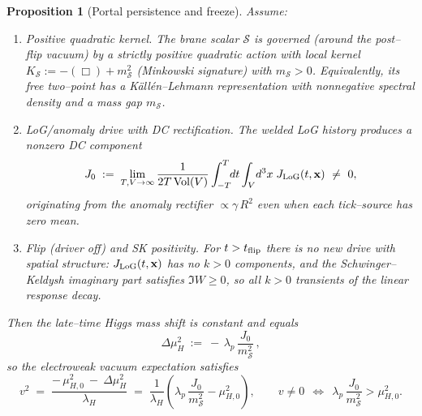 \documentclass[10pt]{article}
\theoremstyle{definition}
\theoremstyle{plain}
\newtheorem{proposition}{Proposition}[section]
\begin{document}
\begin{proposition}[Portal persistence and freeze]
\label{prop:persistence-freeze}
Assume:
\begin{enumerate}[label=(A\arabic*),leftmargin=1.8em,itemsep=2pt]
\item \emph{Positive quadratic kernel.} The brane scalar $\mathcal S$ is governed (around the
post–flip vacuum) by a strictly positive \emph{quadratic} action with local kernel
$K_{\mathcal S}:=-(\Box)+m_{\mathcal S}^2$ (Minkowski signature) with $m_{\mathcal S}>0$.
Equivalently, its free two–point has a Källén–Lehmann representation with nonnegative spectral
density and a mass gap $m_{\mathcal S}$.
\item \emph{LoG/anomaly drive with DC rectification.} The welded LoG history produces a nonzero
DC component
\[
J_0\;:=\;\lim_{T,V\to\infty}\frac{1}{2T\,\mathrm{Vol}(V)}\int_{-T}^{T}\!\!dt\int_{V}\!d^3x\;J_{\rm LoG}(t,\mathbf x)\ \neq\ 0,
\]
originating from the anomaly rectifier $\propto \gamma\,R^2$ even when each tick–source has zero mean.
\item \emph{Flip (driver off) and SK positivity.} For $t>t_{\rm flip}$ there is no new drive with
spatial structure: $J_{\rm LoG}(t,\mathbf x)$ has no $k>0$ components, and the Schwinger–Keldysh
imaginary part satisfies $\Im W\ge 0$, so all $k>0$ transients of the linear response decay.
\end{enumerate}
Then the late–time Higgs mass shift is \emph{constant} and equals
\begin{equation}
\label{eq:Delta-muH-const}
\Delta\mu_H^2\ :=\ -\,\lambda_p\,\frac{J_0}{m_{\mathcal S}^2}\,,
\end{equation}
so the electroweak vacuum expectation satisfies
\begin{equation}
\label{eq:v2-from-portal}
v^2\;=\;\frac{-\,\mu_{H,0}^2\ -\ \Delta\mu_H^2}{\lambda_H}
\;=\;\frac{1}{\lambda_H}\left(\lambda_p\,\frac{J_0}{m_{\mathcal S}^2}-\mu_{H,0}^2\right),
\qquad v\neq 0\ \ \Leftrightarrow\ \ \lambda_p\,\frac{J_0}{m_{\mathcal S}^2}>\mu_{H,0}^2.
\end{equation}
\end{proposition}
\end{document}
